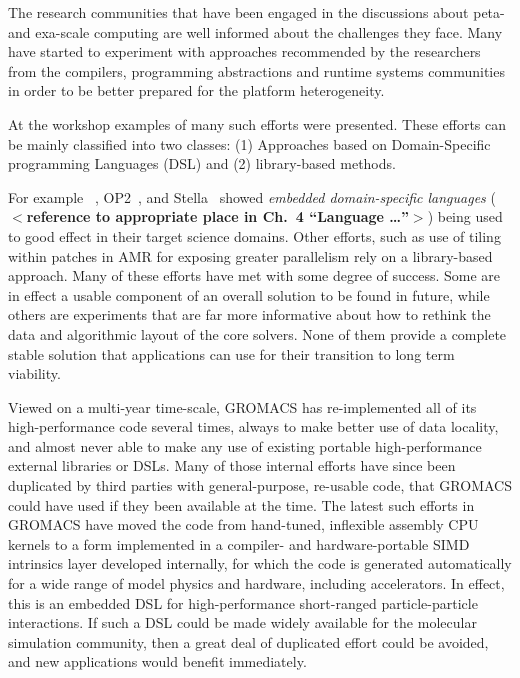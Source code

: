 The research communities that have been engaged in the discussions
about peta- and exa-scale computing are well informed about the
challenges they face.
\textcolor{fhcolor}{Many have started to experiment with approaches
recommended by the researchers from the compilers, programming
abstractions and runtime systems communities in order to be better
prepared for the platform heterogeneity.}

At the workshop examples of many such efforts were presented.
\textcolor{fhcolor}{These efforts can be mainly classified into two
classes: (1) Approaches based on Domain-Specific programming Languages
(DSL) and (2) library-based methods.}

\textcolor{fhcolor}{For example \hipacc~\cite{MHTKE12a}, OP2~\cite{}, and Stella~\cite{} showed
\emph{embedded domain-specific languages} (\textbf{$<$reference to appropriate place in Ch.~4 ``Language \ldots''$>$}) being used to good effect in their target science
domains.}
Other efforts, such as use of tiling within patches in AMR for
exposing greater parallelism rely on a library-based approach.
Many of these efforts
have met with some degree of success. Some are in effect a usable
component of an overall solution to be found in future, while others
are experiments that are far more informative about how to rethink the
data and algorithmic layout of the core solvers. None of them provide
a complete stable solution that applications can use for their
transition to long term viability. 

Viewed on a multi-year time-scale, GROMACS has re-implemented
all of its high-performance code several times, always to make
better use of data locality,\cite{gromacs4,gromacs4.5,gromacs-exascale}
and almost never able to make any use of existing portable high-performance
external libraries or DSLs. Many of those internal efforts have since been
duplicated by third parties with general-purpose, re-usable code,
that GROMACS could have used if they been available at the time.
The latest such efforts in GROMACS have moved the code from
hand-tuned, inflexible assembly CPU kernels to a form implemented
in a compiler- and hardware-portable SIMD intrinsics layer developed
internally, for which the code is generated automatically for a wide
range of model physics and hardware, including accelerators.
In effect, this is an embedded DSL for high-performance short-ranged
particle-particle interactions. If such a DSL could be made widely
available for the molecular simulation community, then a great deal of
duplicated effort could be avoided, and new applications would
benefit immediately.

